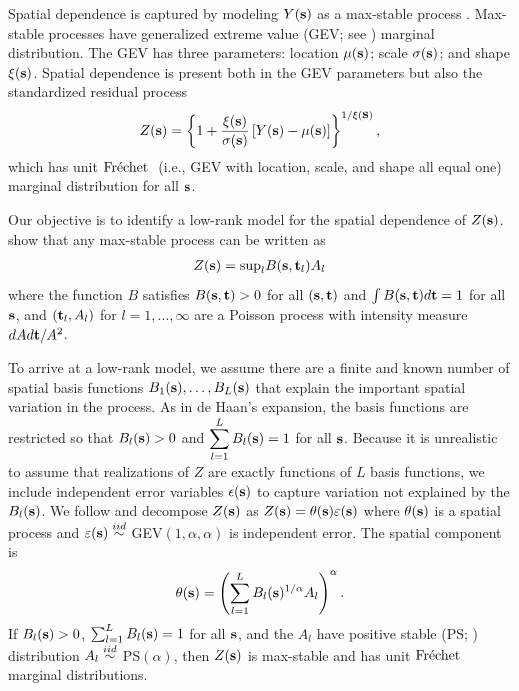 \documentclass[11pt]{article}
\begin{document}
Spatial dependence is captured by modeling $Y(\mbox{\bf s})$ as a max-stable process \citep{deHaan2006}.
Max-stable processes have generalized extreme value (GEV; see ) marginal distribution.
The GEV has three parameters: location $\mu(\mbox{\bf s})$; scale $\sigma(\mbox{\bf s})$; and shape $\xi(\mbox{\bf s})$.
Spatial dependence is present both in the GEV parameters but also the standardized residual process
\begin{align} \label{ebeq:Y2Z}
 Z(\mbox{\bf s}) = \left\{1+\frac{\xi(\mbox{\bf s})}{\sigma(\mbox{\bf s})}\left[Y(\mbox{\bf s}) - \mu(\mbox{\bf s})\right]\right\}^{1/\xi(\mbox{\bf s})},
\end{align}
which has unit $\mbox{Fr$\acute{\mbox{e}}$chet }$ (i.e., GEV with location, scale, and shape all equal one) marginal distribution for all $\mbox{\bf s}$.

Our objective is to identify a low-rank model for the spatial dependence of $Z(\mbox{\bf s})$.
\citep[Chapter 9]{deHaan1984} show that any max-stable process can be written as
\begin{align} \label{ebeq:spectral}
  Z(\mbox{\bf s}) = \mbox{sup}_l B(\mbox{\bf s},\mbox{\bf t}_l)A_{l}
\end{align}
where the function $B$ satisfies $B(\mbox{\bf s},\mbox{\bf t})>0$ for all $(\mbox{\bf s},\mbox{\bf t})$ and $\int B(\mbox{\bf s},\mbox{\bf t})d\mbox{\bf t}=1$ for all $\mbox{\bf s}$, and $(\mbox{\bf t}_l,A_l)$ for $l=1,...,\infty$ are a Poisson process with intensity measure $dA d\mbox{\bf t}/A^2$.

To arrive at a low-rank model, we assume there are a finite and known number of spatial basis functions $B_1(\mbox{\bf s}), \ldots, B_L(\mbox{\bf s})$ that explain the important spatial variation in the process.
As in de Haan's expansion, the basis functions are restricted so that $B_l(\mbox{\bf s}) > 0$ and $\displaystyle \sum_{l = 1}^L B_l(\mbox{\bf s}) = 1$ for all $\mbox{\bf s}$.
Because it is unrealistic to assume that realizations of $Z$ are exactly functions of $L$ basis functions, we include independent error variables $\epsilon(\mbox{\bf s})$ to capture variation not explained by the $B_l(\mbox{\bf s})$.
We follow \citet{Reich2012} and decompose  $Z(\mbox{\bf s})$ as $Z(\mbox{\bf s})=\theta(\mbox{\bf s})\varepsilon(\mbox{\bf s})$ where $\theta(\mbox{\bf s})$ is a spatial process and $\varepsilon(\mbox{\bf s})\stackrel{iid}{\sim}$ GEV$(1,\alpha,\alpha)$ is independent error.
The spatial component is
\begin{align} \label{ebeq:theta}
  \theta(\mbox{\bf s}) = \left(\sum_{l=1}^LB_{l}(\mbox{\bf s})^{1/\alpha}A_{l}\right)^{\alpha}.
\end{align}
If $B_{l}(\mbox{\bf s})>0$, $\sum_{l=1}^LB_{l}(\mbox{\bf s})=1$ for all $\mbox{\bf s}$, and the $A_{l}$ have positive stable (PS; ) distribution $A_{l}\stackrel{iid}{\sim}$ PS$(\alpha)$, then $Z(\mbox{\bf s})$ is max-stable and has unit $\mbox{Fr$\acute{\mbox{e}}$chet }$ marginal distributions.
\end{document}
